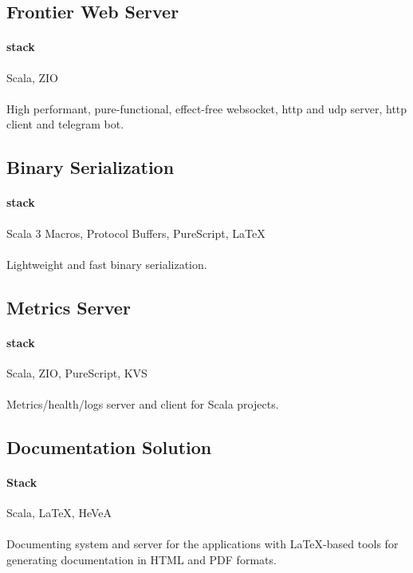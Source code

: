 \subsection{Frontier Web Server}
\paragraph{stack} Scala, ZIO
\paragraph{}
High performant, pure-functional, effect-free websocket, http and udp server, http client and telegram bot.

\subsection{Binary Serialization}
\paragraph{stack}{Scala 3 Macros, Protocol Buffers, PureScript, LaTeX}
\paragraph{}
Lightweight and fast binary serialization.

\subsection{Metrics Server}
\paragraph{stack} Scala, ZIO, PureScript, KVS
\paragraph{}
Metrics/health/logs server and client for Scala projects.

\subsection{Documentation Solution}
\paragraph{Stack} Scala, LaTeX, HeVeA
\paragraph{}
Documenting system and server for the applications with LaTeX-based tools for generating documentation in HTML and PDF formats.

